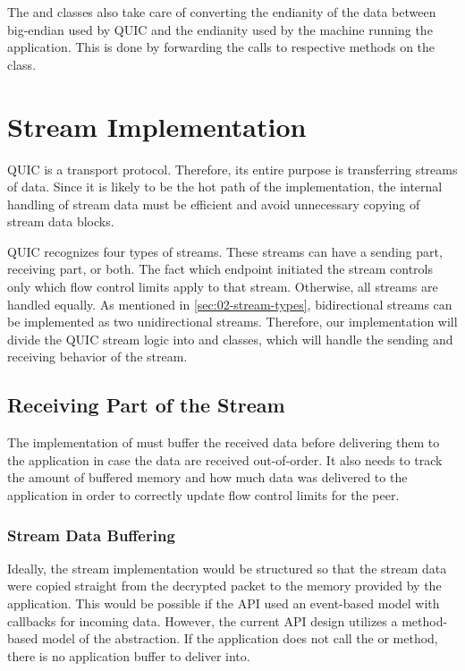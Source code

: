 The \QuicReader{} and \QuicWriter{} classes also take care of converting the endianity of the data
between big-endian used by QUIC and the endianity used by the machine running the application. This
is done by forwarding the calls to respective methods on the  class.

\section{Stream Implementation}\label{sec:03-stream-implementation}

QUIC is a transport protocol. Therefore, its entire purpose is transferring streams of data. Since
it is likely to be the hot path of the implementation, the internal handling of stream data must be
efficient and avoid unnecessary copying of stream data blocks.

QUIC recognizes four types of streams. These streams can have a sending part, receiving part, or
both. The fact which endpoint initiated the stream controls only which flow control limits apply to
that stream. Otherwise, all streams are handled equally. As mentioned in
\autoref{sec:02-stream-types}, bidirectional streams can be implemented as two unidirectional
streams. Therefore, our implementation will divide the QUIC stream logic into \SendStream{} and
\ReceiveStream{} classes, which will handle the sending and receiving behavior of the stream.

\subsection{Receiving Part of the Stream}\label{sec:03-receive-stream}

The implementation of \ReceiveStream{} must buffer the received data before delivering them to the
application in case the data are received out-of-order. It also needs to track the amount of
buffered memory and how much data was delivered to the application in order to correctly update flow
control limits for the peer.

\subsubsection{Stream Data Buffering}

Ideally, the stream implementation would be structured so that the stream data were copied straight
from the decrypted packet to the memory provided by the application. This would be possible if the
API used an event-based model with callbacks for incoming data. However, the current API design
utilizes a method-based model of the \Stream{} abstraction. If the application does not call the
 or  method, there is no application buffer to deliver into.

